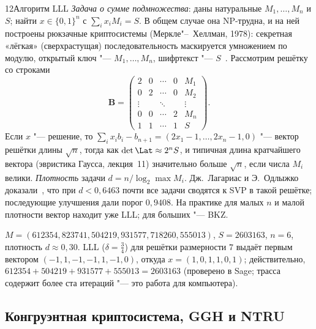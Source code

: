 \begin{lecture}{12}{Алгоритм LLL}
\emph{Задача о сумме подмножества}: даны натуральные $M_1, \dots, M_n$ и $S$; найти
$x \in \{0, 1\}^n$ с $\sum_i x_i M_i = S$. В общем случае она NP-трудна, и на ней построены
рюкзачные криптосистемы (Меркле"--~Хеллман, 1978): секретная «лёгкая» (сверхрастущая)
последовательность маскируется умножением по модулю, открытый ключ "--- $M_1, \dots, M_n$,
шифртекст "--- $S$~\cite[разд.~7.2]{hps}. Рассмотрим решётку со строками
\[
  \mathbf{B} = \begin{pmatrix}
    2 & 0 & \cdots & 0 & M_1 \\
    0 & 2 & \cdots & 0 & M_2 \\
    \vdots & & \ddots & & \vdots \\
    0 & 0 & \cdots & 2 & M_n \\
    1 & 1 & \cdots & 1 & S
  \end{pmatrix}.
\]
Если $x$ "--- решение, то $\sum_i x_i b_i - b_{n+1} = (2x_1 - 1, \dots, 2x_n - 1, 0)$ "---
вектор решётки длины $\sqrt n$, тогда как $\det \Lat \approx 2^n S$, и типичная длина
кратчайшего вектора (эвристика Гаусса, лекция~11) значительно больше $\sqrt n$, если числа $M_i$
велики. \emph{Плотность} задачи $d = n / \log_2 \max M_i$. Дж.~Лагариас и Э.~Одлыжко
доказали~\cite{lagarias-odlyzko}, что при $d < 0{,}6463$ почти все задачи сводятся к SVP
в такой решётке; последующие улучшения дали порог $0{,}9408$. На практике для малых $n$
и малой плотности вектор находит уже LLL; для больших "--- BKZ.

\begin{example}
$M = (612354, 823741, 504219, 931577, 718260, 555013)$, $S = 2603163$, $n = 6$, плотность
$d \approx 0{,}30$. LLL ($\delta = \frac34$) для решётки размерности $7$ выдаёт первым вектором
$(-1, 1, -1, -1, 1, -1, 0)$, откуда $x = (1, 0, 1, 1, 0, 1)$; действительно,
$612354 + 504219 + 931577 + 555013 = 2603163$ (проверено в Sage; трасса содержит более
ста итераций "--- это работа для компьютера).
\end{example}

\subsection{Конгруэнтная криптосистема, GGH и NTRU}


\end{lecture}
